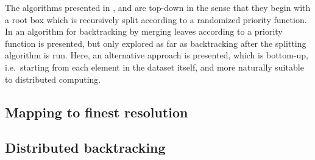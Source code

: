 \documentclass[../scalable-hists.tex]{subfiles}
\begin{document}
  The algorithms presented in \cite{mrp-raaz-harlow-tucker}, \cite{srp-mde-raaz-teng} and 
  \cite{scala-density-tree} are top-down
  in the sense that they begin with a root box which is 
  recursively split according to a randomized priority function.
  In \cite{scala-density-tree} an algorithm for backtracking by merging leaves
  according to a priority function is presented, but only explored as far as backtracking
  after the splitting algorithm is run.
  Here, an alternative approach is presented,
  which is bottom-up, i.e.~starting from each element in the dataset itself, 
  and more naturally suitable to distributed computing.
  
  \subsection{Mapping to finest resolution}
    

  \subsection{Distributed backtracking}
    
\end{document}
